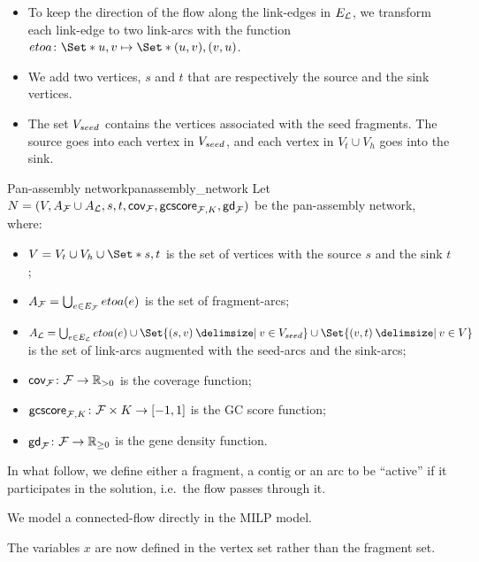 \begin{itemize}
  \item To keep the direction of the flow along the link-edges in \(E_{\mathcal{L}}{}\), we transform each link-edge to two link-arcs with the function \(etoa \colon \Set*{u, v} \mapsto \Set*{(u, v), (v, u)}\).
  \item We add two vertices, \(s\) and \(t\) that are respectively the source and the sink vertices.
  \item The set \(V_{seed}{}\) contains the vertices associated with the seed fragments.
    The source goes into each vertex in \(V_{seed}{}\), and each vertex in \(V_t \cup V_h\) goes into the sink.
\end{itemize}

\begin{definition}{Pan-assembly network}{panassembly_network}
  Let \(N = (V, A_{\mathcal{F}}{} \cup A_{\mathcal{L}}{}, s, t, \mathsf{cov}_{\mathcal{F}{}}, \mathsf{gcscore}_{\mathcal{F}{}, K}, \mathsf{gd}_{\mathcal{F}{}})\) be the pan-assembly network, where:

  \begin{itemize}
    \item \(V = V_t \cup V_h \cup \Set*{s, t}\) is the set of vertices with the source \(s\) and the sink \(t\);
    \item \(A_{\mathcal{F}}{} = \bigcup_{e \in E_{\mathcal{F}}{}} etoa(e)\) is the set of fragment-arcs;
    \item \(A_\Links{} = \bigcup_{e \in E_\Links{}} etoa(e) \cup \Set{(s, v) \given v \in \VSeed{}} \cup \Set{(v, t) \given v \in V}\) is the set of link-arcs augmented with the seed-arcs and the sink-arcs;
    \item \(\mathsf{cov}_{\mathcal{F}{}} \colon \mathcal{F}{} \to \mathbb{R}{}_{> 0}\) is the coverage function;
    \item \(\mathsf{gcscore}_{\mathcal{F}{}, K} \colon \mathcal{F}{} \times K \to [-1, 1]\) is the GC score function;
    \item \(\mathsf{gd}_{\mathcal{F}{}} \colon \mathcal{F}{} \to \mathbb{R}{}_{\geq 0}\) is the gene density function.
  \end{itemize}
\end{definition}

In what follow, we define either a fragment, a contig or an arc to be \enquote{active} if it participates in the solution, i.e.\ the flow passes through it.

\begin{newfeatbox}
  We model a connected-flow directly in the MILP model.

  \begin{notebox}
    The variables \(x\) are now defined in the vertex set rather than the fragment set.
  \end{notebox}
\end{newfeatbox}

